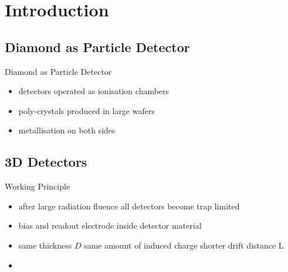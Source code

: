 \section{Introduction}
\subsection{Diamond as Particle Detector}
\begin{frame}{Diamond as Particle Detector}

	
	\begin{itemize}\itemfill
		\item detectors operated as ionisation chambers 
		\item poly-crystals produced in large wafers
		\item metallisation on both sides
	\end{itemize}

\end{frame}

\subsection{3D Detectors}
\begin{frame}{Working Principle}

	\vspace*{-10pt}\vspace*{-10pt}
	
	\begin{itemize}\itemfill
		\item after large radiation fluence all detectors become trap limited
		\item bias and readout electrode inside detector material
		\item same thickness $D$ \ra same amount of induced charge \ra shorter drift distance L
		\item {}
	\end{itemize}

\end{frame}

